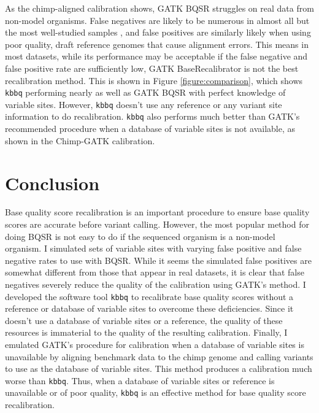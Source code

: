 As the chimp-aligned calibration shows, GATK BQSR struggles on real data from non-model organisms. False negatives are likely to be numerous in almost all but the most well-studied samples \parencite{bobo_false_2016}, and false positives are similarly likely when using poor quality, draft reference genomes that cause alignment errors. This means in most datasets, while its performance may be acceptable if the false negative and false positive rate are sufficiently low, GATK BaseRecalibrator is not the best recalibration method. This is shown in Figure \ref{figure:comparison}, which shows \texttt{kbbq} performing nearly as well as GATK BQSR with perfect knowledge of variable sites. However, \texttt{kbbq} doesn't use any reference or any variant site information to do recalibration. \texttt{kbbq} also performs much better than GATK's recommended procedure when a database of variable sites is not available, as shown in the Chimp-GATK calibration.

\section{Conclusion}

Base quality score recalibration is an important procedure to ensure base quality scores are accurate before variant calling. However, the most popular method for doing BQSR is not easy to do if the sequenced organism is a non-model organism. I simulated sets of variable sites with varying false positive and false negative rates to use with BQSR. While it seems the simulated false positives are somewhat different from those that appear in real datasets, it is clear that false negatives severely reduce the quality of the calibration using GATK's method. I developed the software tool \texttt{kbbq} to recalibrate base quality scores without a reference or database of variable sites to overcome these deficiencies. Since it doesn't use a database of variable sites or a reference, the quality of these resources is immaterial to the quality of the resulting calibration. Finally, I emulated GATK's procedure for calibration when a database of variable sites is unavailable by aligning benchmark data to the chimp genome and calling variants to use as the database of variable sites. This method produces a calibration much worse than \texttt{kbbq}. Thus, when a database of variable sites or reference is unavailable or of poor quality, \texttt{kbbq} is an effective method for base quality score recalibration.

\printbibliography{}

